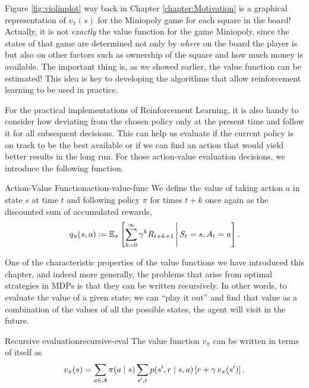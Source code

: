 Figure \ref{fig:violinplot} way back in Chapter \ref{chapter:Motivation} is
a graphical representation of $v_\pi (s)$ for the Miniopoly game for each square
in the board! Actually, it is not \textit{exactly} the value function for the
game Miniopoly, since the states of that game are determined not only by
\textit{where} on the board the player is but also on other factors such as
ownership of the square and how much money is available. The important thing is,
as we showed earlier, the value function can be estimated! This idea is key to
developing the algorithms that allow reinforcement learning to be used in
practice.

For the practical implementations of Reinforcement Learning, it is also handy to
consider how deviating from the chosen policy only at the present time and
follow it for all subsequent decisions. This can help us evaluate if the current
policy is on track to be the best available or if we can find an action that
would yield better results in the long run. For those action-value evaluation
decisions, we introduce the following function.

\begin{dfn}{Action-Value Function}{action-value-func}
	We define the value of taking action $a$ in state $s$ at time $t$ and
	following policy $\pi$ for times $t+k$ once again as the discounted sum of
	accumulated rewards,
	\[
		q_\pi (s, a) \coloneqq \mathbb{E}_{\pi} \left[ \sum_{k=0}^{\infty} \gamma^{k} R_{t+k+1} \,\middle\vert\, S_t = s, A_t = a \right].
	\]
\end{dfn}

One of the characteristic properties of the value functions we have introduced
this chapter, and indeed more generally, the problems that arise from optimal
strategies in MDPs is that they can be written recursively. In other words, to
evaluate the value of a given state; we can ``play it out'' and find that value
as a combination of the values of all the possible states, the agent will visit in
the future.

\begin{lemma}{Recursive evaluation}{recursive-eval}
	The value function $v_\pi$ can be written in terms of itself as
	\[
		v_\pi (s) = \sum_{a \in \mathcal{A}} \pi(a \mid s) \sum_{s', r} p(s', r \mid s, a) \left[ r + \gamma \, v_\pi (s') \right].
	\]
\end{lemma}

